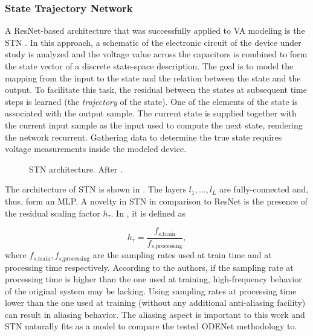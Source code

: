 \subsubsection{State Trajectory Network}

A \ac{ResNet}-based architecture that was successfully applied to \ac{VA} modeling is the \acf{STN} \cite{Parker2019}. In this approach, a schematic of the electronic circuit of the device under study is analyzed and the voltage value across the capacitors is combined to form the state vector of a discrete state-space description. The goal is to model the mapping from the input to the state and the relation between the state and the output. To facilitate this task, the residual between the states at subsequent time steps is learned (the \emph{trajectory} of the state). One of the elements of the state is associated with the output sample. The current state is supplied together with the current input sample as the input used to compute the next state, rendering the network recurrent. Gathering data to determine the true state requires voltage measurements inside the modeled device. 

\begin{figure}
  \centering
  \scalebox{0.7}{}
  \caption{\Acf{STN} architecture. After \cite{Parker2019}.}
  \label{fig:stn}
\end{figure}

The architecture of \ac{STN} is shown in . The layers $l_1, \dots, l_L$ are fully-connected and, thus, form an \ac{MLP}. A novelty in \ac{STN} in comparison to \ac{ResNet} is the presence of the residual scaling factor $h_\tau$. In \cite{Parker2019}, it is defined as

\begin{equation}
  h_\tau = \frac{f_{s\text{,train}}}{f_{s\text{,processing}}},
\end{equation}
where $f_{s\text{,train}}, f_{s\text{,processing}}$ are the sampling rates used at train time and at processing time respectively. According to the authors, if the sampling rate at processing time is higher than the one used at training, high-frequency behavior of the original system may be lacking. Using sampling rates at processing time lower than the one used at training (without any additional anti-aliasing facility) can result in aliasing behavior. The aliasing aspect is important to this work and \ac{STN} naturally fits as a model to compare the tested ODENet methodology to.

